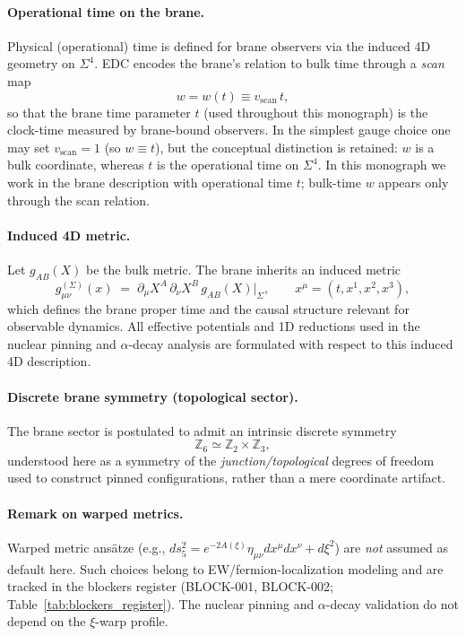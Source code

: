 \documentclass[11pt,a4paper]{article}
\begin{document}
\paragraph{Operational time on the brane.}
Physical (operational) time is defined for brane observers via the induced 4D geometry on $\Sigma^4$.
EDC encodes the brane's relation to bulk time through a \emph{scan} map
\begin{equation}
w = w(t) \equiv v_{\mathrm{scan}}\, t,
\label{eq:scan_time}
\end{equation}
so that the brane time parameter $t$ (used throughout this monograph) is the clock-time measured by brane-bound observers.
In the simplest gauge choice one may set $v_{\mathrm{scan}}=1$ (so $w\equiv t$), but the conceptual distinction is retained: $w$ is a bulk coordinate, whereas $t$ is the operational time on $\Sigma^4$.
In this monograph we work in the brane description with operational time $t$; bulk-time $w$ appears only through the scan relation.

\paragraph{Induced 4D metric.}
Let $g_{AB}(X)$ be the bulk metric. The brane inherits an induced metric
\begin{equation}
g^{(\Sigma)}_{\mu\nu}(x) \;=\; \partial_{\mu}X^{A}\,\partial_{\nu}X^{B}\,g_{AB}(X)\big|_{\Sigma},
\qquad x^{\mu}=(t,x^{1},x^{2},x^{3}),
\label{eq:induced_metric}
\end{equation}
which defines the brane proper time and the causal structure relevant for observable dynamics.
All effective potentials and 1D reductions used in the nuclear pinning and $\alpha$-decay analysis are formulated with respect to this induced 4D description.

\paragraph{Discrete brane symmetry (topological sector).}
The brane sector is postulated to admit an intrinsic discrete symmetry
\[
\mathbb{Z}_{6} \simeq \mathbb{Z}_{2}\times \mathbb{Z}_{3},
\]
understood here as a symmetry of the \emph{junction/topological} degrees of freedom used to construct pinned configurations, rather than a mere coordinate artifact.

\paragraph{Remark on warped metrics.}
Warped metric ans\"atze (e.g., $ds^{2}_{5}=e^{-2A(\xi)}\eta_{\mu\nu}dx^{\mu}dx^{\nu}+d\xi^{2}$) are \emph{not} assumed as default here.
Such choices belong to EW/fermion-localization modeling and are tracked in the blockers register (BLOCK-001, BLOCK-002; Table~\ref{tab:blockers_register}).
The nuclear pinning and $\alpha$-decay validation do not depend on the $\xi$-warp profile.
\end{document}
